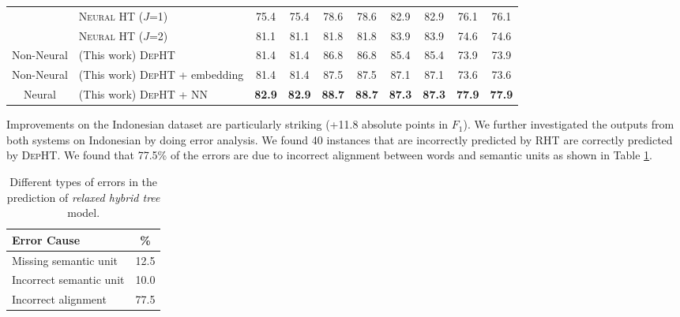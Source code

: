 \begin{table*}[h!]
{\begin{tabular}{clcccccccc}
			&\textsc{Neural HT} ($J$=1)&75.4&75.4&78.6&78.6&82.9&82.9&76.1 &76.1 \\
			&\textsc{Neural HT} ($J$=2)&81.1&81.1&{81.8}&{81.8}&83.9&83.9&74.6&74.6\\ \hline\hline
			Non-Neural&(This work) \textsc{DepHT}   & 81.4 & 81.4& 86.8 & 86.8 & 85.4 & 85.4 & 73.9& 73.9    \\
			Non-Neural&(This work) \textsc{DepHT} + embedding  & 81.4 & 81.4& 87.5 & 87.5 & 87.1 & 87.1 & 73.6 & 73.6    \\
			Neural&(This work) \textsc{DepHT} + NN  & {\bf 82.9} & {\bf 82.9} & {\bf 88.7} & {\bf 88.7} & {\bf 87.3} & {\bf 87.3} & {\bf 77.9}& {\bf 77.9} \\
			\bottomrule
		\end{tabular}
	}
	\caption{Performance comparison with state-of-the-art models on GeoQuery dataset. ($\dagger$ represents the system is using lambda-calculus expressions as meaning representations.)}
	\label{tab:nonneuralresults2}
\end{table*}



Improvements on the Indonesian dataset are particularly striking (+11.8 absolute points in $F_1$).
We further investigated the outputs from both systems on Indonesian by doing error analysis.
We found 40 instances that are incorrectly predicted by \textsc{RHT} are correctly predicted by \textsc{DepHT}. 
We found that 77.5\% of the errors are due to incorrect alignment between words and semantic units as shown in Table \ref{tab:errors}.

\begin{table}[h!]
	\centering
	
	\begin{tabular}{lc}
		\toprule 
		Error Cause & \% \\\midrule
		Missing semantic unit & 12.5\\
		Incorrect semantic unit & 10.0\\
		Incorrect alignment & 77.5\\
		\bottomrule 
	\end{tabular}
	
	\caption{Different types of errors in the prediction of {\em relaxed hybrid tree} model. }
	\label{tab:errors}
\end{table}

